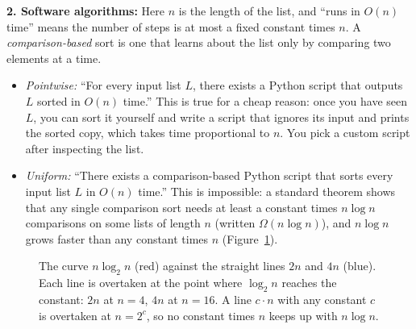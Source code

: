\textbf{2. Software algorithms:} Here $n$ is the length of the list, and ``runs in $O(n)$ time'' means the number of steps is at most a fixed constant times $n$. A \emph{comparison-based} sort is one that learns about the list only by comparing two elements at a time.
\begin{itemize}
\item \emph{Pointwise:} ``For every input list $L$, there exists a Python script that outputs $L$ sorted in $O(n)$ time.'' This is true for a cheap reason: once you have seen $L$, you can sort it yourself and write a script that ignores its input and prints the sorted copy, which takes time proportional to $n$. You pick a custom script after inspecting the list.
\item \emph{Uniform:} ``There exists a comparison-based Python script that sorts every input list $L$ in $O(n)$ time.'' This is impossible: a standard theorem shows that any single comparison sort needs at least a constant times $n \log n$ comparisons on some lists of length $n$ (written $\Omega(n \log n)$), and $n \log n$ grows faster than any constant times $n$ (Figure~\ref{04:fig-nlogn}).
\end{itemize}

\begin{figure}[htbp]
\centering
{}
\caption{The curve $n \log_2 n$ (red) against the straight lines $2n$ and $4n$ (blue). Each line is overtaken at the point where $\log_2 n$ reaches the constant: $2n$ at $n = 4$, $4n$ at $n = 16$. A line $c \cdot n$ with any constant $c$ is overtaken at $n = 2^c$, so no constant times $n$ keeps up with $n \log n$.}
\label{04:fig-nlogn}
\end{figure}

